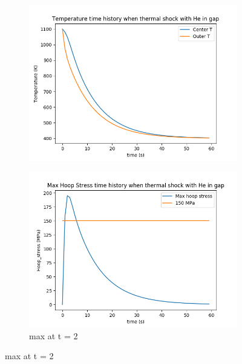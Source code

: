 \documentclass[12pt]{article}
\begin{document}
\begin{itemize}
\begin{figure}[h]
\begin{subfigure}[b]{0.4\textwidth}
        \caption{}
        \label{fig:tiger}
    \end{subfigure}
    ~ 
    \begin{subfigure}[b]{0.4\textwidth}
        \includegraphics[width=\textwidth]{thermalShock_He_T_vs_t.png}
        \caption{}
        \label{fig:t750}
    \end{subfigure}
        \begin{subfigure}[b]{0.4\textwidth}
        \includegraphics[width=\textwidth]{thermalShock_He_stress_vs_t.png}
        \caption{max at t = 2}
        \label{fig:t1000}
    \end{subfigure}
\end{figure}
\pagebreak


\end{itemize}
\end{document}
